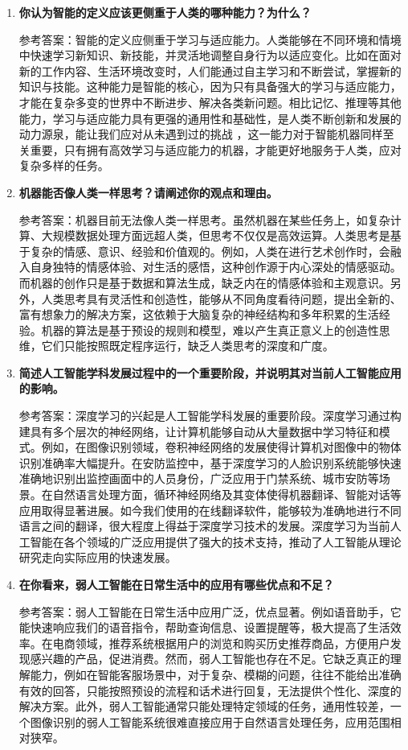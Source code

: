 \begin{enumerate}
\item \textbf{你认为智能的定义应该更侧重于人类的哪种能力？为什么？}

参考答案：智能的定义应侧重于学习与适应能力。人类能够在不同环境和情境中快速学习新知识、新技能，并灵活地调整自身行为以适应变化。比如在面对新的工作内容、生活环境改变时，人们能通过自主学习和不断尝试，掌握新的知识与技能。这种能力是智能的核心，因为只有具备强大的学习与适应能力，才能在复杂多变的世界中不断进步、解决各类新问题。相比记忆、推理等其他能力，学习与适应能力具有更强的通用性和基础性，是人类不断创新和发展的动力源泉，能让我们应对从未遇到过的挑战 ，这一能力对于智能机器同样至关重要，只有拥有高效学习与适应能力的机器，才能更好地服务于人类，应对复杂多样的任务。


\item \textbf{机器能否像人类一样思考？请阐述你的观点和理由。}

参考答案：机器目前无法像人类一样思考。虽然机器在某些任务上，如复杂计算、大规模数据处理方面远超人类，但思考不仅仅是高效运算。人类思考是基于复杂的情感、意识、经验和价值观的。例如，人类在进行艺术创作时，会融入自身独特的情感体验、对生活的感悟，这种创作源于内心深处的情感驱动。而机器的创作只是基于数据和算法生成，缺乏内在的情感体验和主观意识。另外，人类思考具有灵活性和创造性，能够从不同角度看待问题，提出全新的、富有想象力的解决方案，这依赖于大脑复杂的神经结构和多年积累的生活经验。机器的算法是基于预设的规则和模型，难以产生真正意义上的创造性思维，它们只能按照既定程序运行，缺乏人类思考的深度和广度。


\item \textbf{简述人工智能学科发展过程中的一个重要阶段，并说明其对当前人工智能应用的影响。}

参考答案：深度学习的兴起是人工智能学科发展的重要阶段。深度学习通过构建具有多个层次的神经网络，让计算机能够自动从大量数据中学习特征和模式。例如，在图像识别领域，卷积神经网络的发展使得计算机对图像中的物体识别准确率大幅提升。在安防监控中，基于深度学习的人脸识别系统能够快速准确地识别出监控画面中的人员身份，广泛应用于门禁系统、城市安防等场景。在自然语言处理方面，循环神经网络及其变体使得机器翻译、智能对话等应用取得显著进展。如今我们使用的在线翻译软件，能够较为准确地进行不同语言之间的翻译，很大程度上得益于深度学习技术的发展。深度学习为当前人工智能在各个领域的广泛应用提供了强大的技术支持，推动了人工智能从理论研究走向实际应用的快速发展。

\item \textbf{在你看来，弱人工智能在日常生活中的应用有哪些优点和不足？}

参考答案：弱人工智能在日常生活中应用广泛，优点显著。例如语音助手，它能快速响应我们的语音指令，帮助查询信息、设置提醒等，极大提高了生活效率。在电商领域，推荐系统根据用户的浏览和购买历史推荐商品，方便用户发现感兴趣的产品，促进消费。然而，弱人工智能也存在不足。它缺乏真正的理解能力，例如在智能客服场景中，对于复杂、模糊的问题，往往不能给出准确有效的回答，只能按照预设的流程和话术进行回复，无法提供个性化、深度的解决方案。此外，弱人工智能通常只能处理特定领域的任务，通用性较差，一个图像识别的弱人工智能系统很难直接应用于自然语言处理任务，应用范围相对狭窄。


\end{enumerate}
